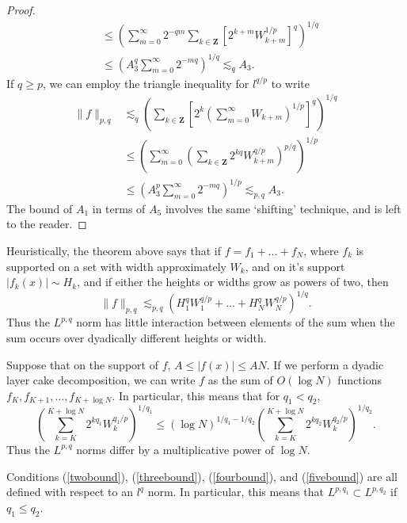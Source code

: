 \begin{proof}
\begin{align*}
        &\leq \left( \sum_{m = 0}^\infty 2^{-qm} \sum_{k \in \mathbf{Z}} \left[ 2^{k+m} W_{k+m}^{1/p} \right]^q \right)^{1/q}\\
        &\leq \left( A_3^q \sum_{m = 0}^\infty 2^{-mq} \right)^{1/q} \lesssim_q A_3.
    \end{align*}
    If $q \geq p$, we can employ the triangle inequality for $l^{q/p}$ to write
    \begin{align*}
        \| f \|_{p,q} &\lesssim_q \left( \sum_{k \in \mathbf{Z}} \left[2^k \left( \sum_{m = 0}^\infty W_{k + m}  \right)^{1/p} \right]^q \right)^{1/q}\\
        &\leq \left( \sum_{m = 0}^\infty \left( \sum_{k \in \mathbf{Z}} 2^{kq} W_{k+m}^{q/p} \right)^{p/q} \right)^{1/p}\\
        &\leq \left( A_3^p \sum_{m = 0}^\infty 2^{-mq} \right)^{1/p} \lesssim_{p,q} A_3.
    \end{align*}
    The bound of $A_1$ in terms of $A_5$ involves the same `shifting' technique, and is left to the reader.
\end{proof}

\begin{remark}
    Heuristically, the theorem above says that if $f = f_1 + \dots + f_N$, where $f_k$ is supported on a set with width approximately $W_k$, and on it's support $|f_k(x)| \sim H_k$, and if either the heights or widths grow as powers of two, then
    \[ \| f \|_{p,q} \lesssim_{p,q} \left( H_1^q W_1^{q/p} + \dots + H_N^q W_N^{q/p} \right)^{1/q}. \]
    Thus the $L^{p,q}$ norm has little interaction between elements of the sum when the sum occurs over dyadically different heights or width.
\end{remark}

\begin{remark}
    Suppose that on the support of $f$, $A \leq |f(x)| \leq AN$. If we perform a dyadic layer cake decomposition, we can write $f$ as the sum of $O(\log N)$ functions $f_K, f_{K+1}, \dots, f_{K+\log N}$. In particular, this means that for $q_1 < q_2$,
    \[ \left( \sum_{k = K}^{K + \log N} 2^{kq_1} W_k^{q_1/p} \right)^{1/q_1} \leq (\log N)^{1/q_1 - 1/q_2} \left( \sum_{k = K}^{K + \log N} 2^{kq_2} W_k^{q_2/p} \right)^{1/q_2}. \]
    Thus the $L^{p,q}$ norms differ by a multiplicative power of $\log N$.
\end{remark}

\begin{remark}
    Conditions (\ref{twobound}), (\ref{threebound}), (\ref{fourbound}), and (\ref{fivebound}) are all defined with respect to an $l^q$ norm. In particular, this means that $L^{p,q_1} \subset L^{p,q_2}$ if $q_1 \leq q_2$.
\end{remark}

